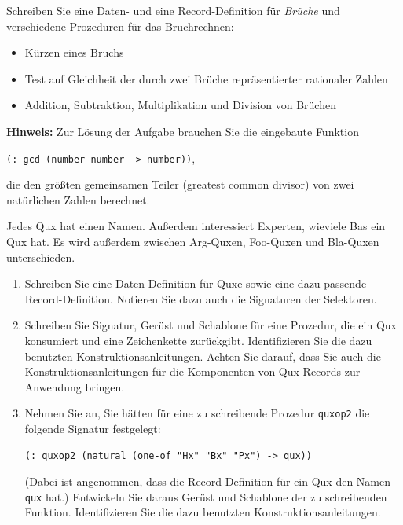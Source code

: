 \begin{aufgabe}

  Schreiben Sie eine Daten- und eine
  Record-Definition für \textit{Brüche} und verschiedene Prozeduren
  für das Bruchrechnen:
  \begin{itemize}
  \item Kürzen eines Bruchs
  \item Test auf Gleichheit der durch zwei Brüche repräsentierter
    rationaler Zahlen
  \item Addition, Subtraktion, Multiplikation und Division von
    Brüchen
  \end{itemize}

  \textbf{Hinweis:} Zur Lösung der Aufgabe brauchen Sie die eingebaute
  Funktion
  \begin{center}
    \texttt{(: gcd (number number -> number))},
  \end{center}
  die den größten gemeinsamen Teiler (greatest common divisor) von
  zwei natürlichen Zahlen berechnet.

\end{aufgabe}

\begin{aufgabe}

  Jedes Qux hat einen Namen.  Außerdem interessiert
  Experten, wieviele Bas ein Qux hat.  Es wird außerdem zwischen
  Arg-Quxen, Foo-Quxen und Bla-Quxen unterschieden.
  \begin{enumerate}
  \item Schreiben Sie eine Daten-Definition für Quxe sowie eine dazu
    passende Record-Definition. Notieren Sie dazu auch die Signaturen der
    Selektoren.
  \item Schreiben Sie Signatur, Gerüst und Schablone für eine Prozedur,
    die ein Qux konsumiert und eine Zeichenkette zurückgibt.
    Identifizieren Sie die dazu benutzten Konstruktionsanleitungen.
    Achten Sie darauf, dass Sie auch die Konstruktionsanleitungen für die
    Komponenten von Qux-Records zur Anwendung bringen.
  \item Nehmen Sie an, Sie hätten für eine zu schreibende Prozedur
    \texttt{quxop2} die folgende Signatur festgelegt:
\begin{verbatim}
(: quxop2 (natural (one-of "Hx" "Bx" "Px") -> qux))
\end{verbatim}
    (Dabei ist angenommen, dass die Record-Definition für ein Qux
    den Namen \texttt{qux} hat.) Entwickeln Sie daraus Gerüst und
    Schablone der zu schreibenden Funktion.  Identifizieren Sie die dazu
    benutzten Konstruktionsanleitungen.
  \end{enumerate}

\end{aufgabe}

